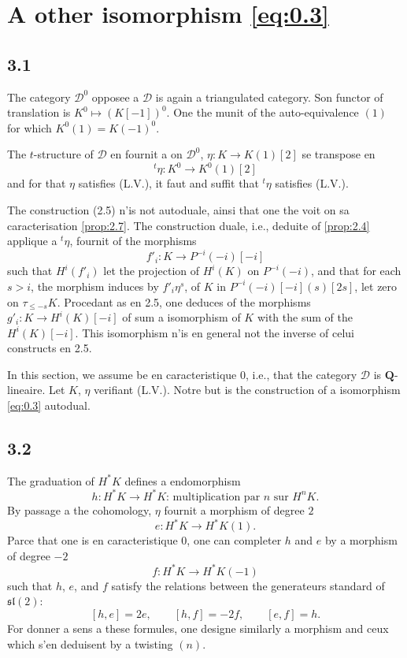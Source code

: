 \documentclass[11pt,a4paper]{article}
\theoremstyle{plain}
\theoremstyle{definition}
\newcommand{\cD}{\mathscr{D}}
\newcommand{\bQ}{\mathbf{Q}}
\begin{document}
\section{A other isomorphism \eqref{eq:0.3}}

\subsection*{3.1}
The category $\cD^0$ opposee a $\cD$ is again a triangulated category. Son functor of translation is $K^0 \mapsto (K[-1])^0$. One the munit of the auto-equivalence $(1)$ for which $K^0(1) = K(-1)^0$.

The $t$-structure of $\cD$ en fournit a on $\cD^0$, $\eta \colon K \to K(1)[2]$ se transpose en
\[
{}^t\eta \colon K^0 \to K^0(1)[2]
\]
and for that $\eta$ satisfies (L.V.), it faut and suffit that ${}^t\eta$ satisfies (L.V.).

The construction (2.5) n'is not autoduale, ainsi that one the voit on sa caracterisation \ref{prop:2.7}. The construction duale, i.e., deduite of \ref{prop:2.4} applique a ${}^t\eta$, fournit of the morphisms
\[
f'_i \colon K \to P^{-i}(-i)[-i]
\]
such that $H^i(f'_i)$ let the projection of $H^i(K)$ on $P^{-i}(-i)$, and that for each $s > i$, the morphism induces by $f'_i \eta^s$, of $K$ in $P^{-i}(-i)[-i](s)[2s]$, let zero on $\tau_{\leqslant -s} K$. Procedant as en 2.5, one deduces of the morphisms $g'_i \colon K \to H^i(K)[-i]$ of sum a isomorphism of $K$ with the sum of the $H^i(K)[-i]$. This isomorphism n'is en general not the inverse of celui constructs en 2.5.

In this section, we assume be en caracteristique $0$, i.e., that the category $\cD$ is $\bQ$-lineaire. Let $K$, $\eta$ verifiant (L.V.). Notre but is the construction of a isomorphism \eqref{eq:0.3} autodual.

\subsection*{3.2}
The graduation of $H^*K$ defines a endomorphism
\[
h \colon H^* K \to H^* K \text{: multiplication par } n \text{ sur } H^n K.
\]
By passage a the cohomology, $\eta$ fournit a morphism of degree $2$
\[
e \colon H^* K \to H^* K(1).
\]
Parce that one is en caracteristique $0$, one can completer $h$ and $e$ by a morphism of degree $-2$
\[
f \colon H^* K \to H^* K(-1)
\]
such that $h$, $e$, and $f$ satisfy the relations between the generateurs standard of $\mathfrak{sl}(2)$:
\[
[h,e] = 2e, \qquad [h,f] = -2f, \qquad [e,f] = h.
\]
For donner a sens a these formules, one designe similarly a morphism and ceux which s'en deduisent by a twisting $(n)$.
\end{document}
